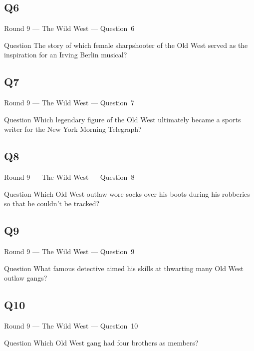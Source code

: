\documentclass[11pt]{beamer}
\begin{document}
\subsection*{Q6}
\begin{frame}[t]{Round 9 --- The Wild West --- \mbox{Question 6}}
\vspace{-0.5em}
\begin{block}{Question}
The story of which female sharpshooter of the Old West served as the inspiration for an Irving Berlin musical?
\end{block}
\end{frame}
\subsection*{Q7}
\begin{frame}[t]{Round 9 --- The Wild West --- \mbox{Question 7}}
\vspace{-0.5em}
\begin{block}{Question}
Which legendary figure of the Old West ultimately became a sports writer for the New York Morning Telegraph?
\end{block}
\end{frame}
\subsection*{Q8}
\begin{frame}[t]{Round 9 --- The Wild West --- \mbox{Question 8}}
\vspace{-0.5em}
\begin{block}{Question}
Which Old West outlaw wore socks over his boots during his robberies so that he couldn't be tracked?
\end{block}
\end{frame}
\subsection*{Q9}
\begin{frame}[t]{Round 9 --- The Wild West --- \mbox{Question 9}}
\vspace{-0.5em}
\begin{block}{Question}
What famous detective aimed his skills at thwarting many Old West outlaw gangs? 
\end{block}
\end{frame}
\subsection*{Q10}
\begin{frame}[t]{Round 9 --- The Wild West --- \mbox{Question 10}}
\vspace{-0.5em}
\begin{block}{Question}
Which Old West gang had four brothers as members?
\end{block}
\end{frame}
\end{document}
